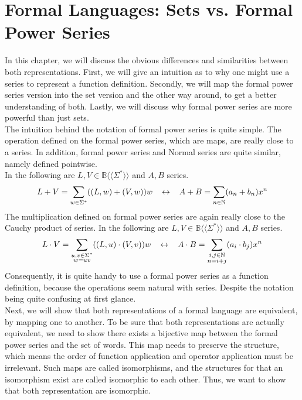 \documentclass[12pt,letterpaper]{article}
\newcommand{\fps}[1] {
\mathbb{#1}\langle \langle \Sigma^* \rangle \rangle
}
\begin{document}
\section{Formal Languages: Sets vs. Formal Power Series}
In this chapter, we will discuss the obvious differences and  similarities between both representations. First, we will give an intuition as to why one might use a series to represent a function definition.
Secondly, we will map the formal power series version into the set
version and the other way around, to get a better understanding of both.
Lastly, we will discuss why formal power series are more powerful
than just sets.\\
The intuition behind the notation of formal power series is quite simple.
The operation defined on the formal power series, which are maps, 
are really close to a series. In addition, formal power series and 
Normal series are quite similar, namely defined pointwise.\\
In the following are $L,V \in \fps{B}$ and $A,B$ series.
\[ 
  L + V = \sum_{w \in \Sigma^*} ((L,w) + (V,w))w \hspace{0.3cm}
  \leftrightarrow \hspace{0.3cm}
  A + B = \sum_{n \in \mathbb{N}} (a_n + b_n) x^n
\]
The multiplication defined on formal power series are again really close
to the Cauchy product of series.
In the following are $L,V \in \fps{B}$ and $A,B$ series.
\[
  L \cdot V = \sum_{\substack{u,v \in \Sigma^* \\ w=uv}} 
  ((L,u) \cdot (V,v))w
  \hspace{0.3cm} \leftrightarrow \hspace{0.3cm}
  A \cdot B = 
  \sum_{\substack{i,j \in \mathbb{N} \\ n = i + j}} (a_i \cdot b_j) x^n
\]
Consequently, it is quite handy to use a formal power series as a function definition, because the operations seem natural with series.
Despite the notation being quite confusing at first glance.\\
Next, we will show that both representations of a formal language are  equivalent, by mapping one to another.
To be sure that both representations are actually equivalent, we need to show there exists a bijective map between the formal power series and the set of words. 
This map needs to preserve the structure, which means the order of function application and operator application must be irrelevant.
Such maps are called isomorphisms, and the structures for that an isomorphism 
exist are called isomorphic to each other. Thus, we want to show that both representation are isomorphic.
\end{document}

